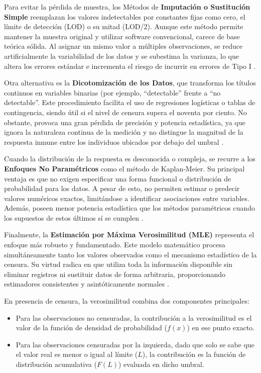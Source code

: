 Para evitar la pérdida de muestra, los Métodos de \textbf{Imputación o Sustitución Simple} reemplazan los valores indetectables por constantes fijas como cero, el límite de detección (LOD) o su mitad (LOD/2). Aunque este método permite mantener la muestra original y utilizar software convencional, carece de base teórica sólida. Al asignar un mismo valor a múltiples observaciones, se reduce artificialmente la variabilidad de los datos y se subestima la varianza, lo que altera los errores estándar e incrementa el riesgo de incurrir en errores de Tipo I \cite{turkson, tran2021measuring}.

Otra alternativa es la \textbf{Dicotomización de los Datos}, que transforma los títulos continuos en variables binarias (por ejemplo, \enquote{detectable}  frente a \enquote{no detectable}. Este procedimiento facilita el uso de regresiones logísticas o tablas de contingencia, siendo útil si el nivel de censura supera el noventa por ciento. No obstante, provoca una gran pérdida de precisión y potencia estadística, ya que ignora la naturaleza continua de la medición y no distingue la magnitud de la respuesta inmune entre los individuos ubicados por debajo del umbral \cite{turkson}.

Cuando la distribución de la respuesta es desconocida o compleja, se recurre a los \textbf{Enfoques No Paramétricos} como el método de Kaplan‐Meier. Su principal ventaja es que no exigen especificar una forma funcional o distribución de probabilidad para los datos. A pesar de esto, no permiten estimar o predecir valores numéricos exactos, limitándose a identificar asociaciones entre variables. Además, poseen menor potencia estadística que los métodos paramétricos cuando los supuestos de estos últimos sí se cumplen \cite{turkson, tran2021measuring}.

Finalmente, la \textbf{Estimación por Máxima Verosimilitud (MLE)} representa el enfoque más robusto y fundamentado. Este modelo matemático procesa simultáneamente tanto los valores observados como el mecanismo estadístico de la censura. Su virtud radica en que utiliza toda la información disponible sin eliminar registros ni sustituir datos de forma arbitraria, proporcionando estimadores consistentes y asintóticamente normales \cite{turkson,tran2021measuring}.

En presencia de censura, la verosimilitud combina dos componentes principales:
\begin{itemize}
	\item Para las observaciones no censuradas, la contribución a la verosimilitud es el valor de la función de densidad de probabilidad ($f(x)$) en ese punto exacto.
	\item Para las observaciones censuradas por la izquierda, dado que solo se sabe que el valor real es menor o igual al límite ($L$), la contribución es la función de distribución acumulativa ($F(L)$) evaluada en dicho umbral.
\end{itemize}

